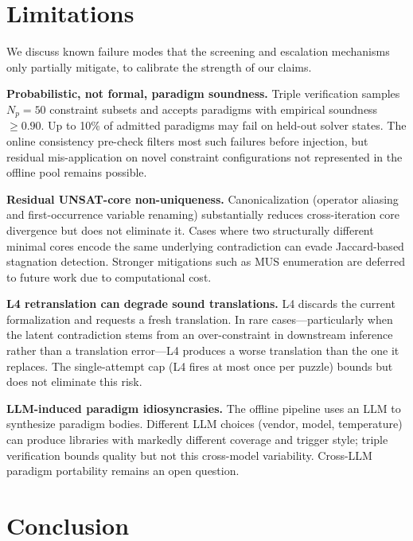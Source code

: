 
\section{Limitations}
\label{sec:limitations}

We discuss known failure modes that the screening and escalation mechanisms only partially mitigate, to calibrate the strength of our claims.

\textbf{Probabilistic, not formal, paradigm soundness.} Triple verification samples $N_p = 50$ constraint subsets and accepts paradigms with empirical soundness $\geq 0.90$. Up to 10\% of admitted paradigms may fail on held-out solver states. The online consistency pre-check filters most such failures before injection, but residual mis-application on novel constraint configurations not represented in the offline pool remains possible.

\textbf{Residual UNSAT-core non-uniqueness.} Canonicalization (operator aliasing and first-occurrence variable renaming) substantially reduces cross-iteration core divergence but does not eliminate it. Cases where two structurally different minimal cores encode the same underlying contradiction can evade Jaccard-based stagnation detection. Stronger mitigations such as MUS enumeration are deferred to future work due to computational cost.

\textbf{L4 retranslation can degrade sound translations.} L4 discards the current formalization and requests a fresh translation. In rare cases—particularly when the latent contradiction stems from an over-constraint in downstream inference rather than a translation error—L4 produces a worse translation than the one it replaces. The single-attempt cap (L4 fires at most once per puzzle) bounds but does not eliminate this risk.

\textbf{LLM-induced paradigm idiosyncrasies.} The offline pipeline uses an LLM to synthesize paradigm bodies. Different LLM choices (vendor, model, temperature) can produce libraries with markedly different coverage and trigger style; triple verification bounds quality but not this cross-model variability. Cross-LLM paradigm portability remains an open question.

\section{Conclusion}
\label{sec:conclusion}

